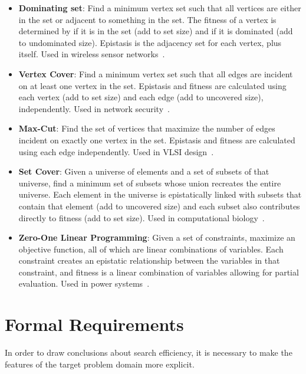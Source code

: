 \begin{itemize}
\item \textbf{Dominating set}: Find a minimum vertex
set such that all vertices are either in the set or adjacent to something in the set.
The fitness of a vertex is determined by if it is in the set (add to set size) and if
it is dominated (add to undominated size). Epistasis is the adjacency set for each
vertex, plus itself. Used in wireless sensor networks~\cite{zhao:2013:dominatingset}.

\item \textbf{Vertex Cover}: Find a minimum vertex
set such that all edges are incident on at least one vertex in the set.
Epistasis and fitness are calculated using each vertex (add to set size)
and each edge (add to uncovered size), independently. Used in network security~\cite{richter:2007:vertexcover}.

\item \textbf{Max-Cut}: Find the set of vertices that maximize the number of edges
incident on exactly one vertex in the set. Epistasis and fitness are calculated
using each edge independently. Used in VLSI design~\cite{festa:2002:maxcut}.

\item \textbf{Set Cover}: Given a universe of elements and a set of subsets of that universe,
find a minimum set of subsets whose union recreates the entire universe. Each element in
the universe is epistatically linked with subsets that contain that element (add to uncovered size)
and each subset also contributes directly to fitness (add to set size). Used in
computational biology~\cite{painsky:2014:setcover}.

\item \textbf{Zero-One Linear Programming}: Given a set of constraints, maximize an
objective function, all of which are linear combinations of variables. Each constraint
creates an epistatic relationship between the variables in that constraint, and fitness
is a linear combination of variables allowing for partial evaluation. Used in power systems~\cite{arroyo:2000:linearprogram}.
\end{itemize}

\section{Formal Requirements}
In order to draw conclusions about search efficiency, it is necessary to make the features
of the target problem domain more explicit.

